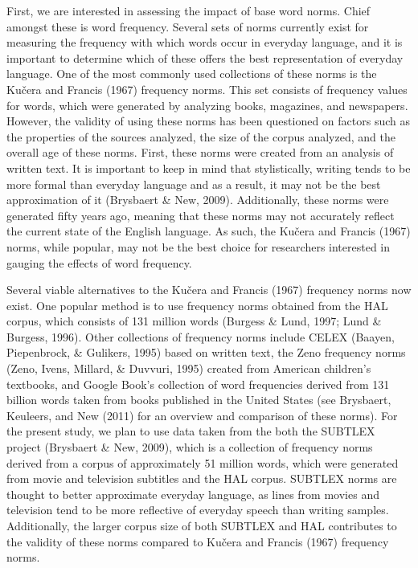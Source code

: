 \documentclass[english,man]{apa6}
\theoremstyle{definition}
\theoremstyle{definition}
\theoremstyle{definition}
\theoremstyle{remark}
\begin{document}
First, we are interested in assessing the impact of base word norms.
Chief amongst these is word frequency. Several sets of norms currently
exist for measuring the frequency with which words occur in everyday
language, and it is important to determine which of these offers the
best representation of everyday language. One of the most commonly used
collections of these norms is the Kučera and Francis (1967) frequency
norms. This set consists of frequency values for words, which were
generated by analyzing books, magazines, and newspapers. However, the
validity of using these norms has been questioned on factors such as the
properties of the sources analyzed, the size of the corpus analyzed, and
the overall age of these norms. First, these norms were created from an
analysis of written text. It is important to keep in mind that
stylistically, writing tends to be more formal than everyday language
and as a result, it may not be the best approximation of it (Brysbaert
\& New, 2009). Additionally, these norms were generated fifty years ago,
meaning that these norms may not accurately reflect the current state of
the English language. As such, the Kučera and Francis (1967) norms,
while popular, may not be the best choice for researchers interested in
gauging the effects of word frequency.

Several viable alternatives to the Kučera and Francis (1967) frequency
norms now exist. One popular method is to use frequency norms obtained
from the HAL corpus, which consists of 131 million words (Burgess \&
Lund, 1997; Lund \& Burgess, 1996). Other collections of frequency norms
include CELEX (Baayen, Piepenbrock, \& Gulikers, 1995) based on written
text, the Zeno frequency norms (Zeno, Ivens, Millard, \& Duvvuri, 1995)
created from American children's textbooks, and Google Book's collection
of word frequencies derived from 131 billion words taken from books
published in the United States (see Brysbaert, Keuleers, and New (2011)
for an overview and comparison of these norms). For the present study,
we plan to use data taken from the both the SUBTLEX project (Brysbaert
\& New, 2009), which is a collection of frequency norms derived from a
corpus of approximately 51 million words, which were generated from
movie and television subtitles and the HAL corpus. SUBTLEX norms are
thought to better approximate everyday language, as lines from movies
and television tend to be more reflective of everyday speech than
writing samples. Additionally, the larger corpus size of both SUBTLEX
and HAL contributes to the validity of these norms compared to Kučera
and Francis (1967) frequency norms.
\end{document}
